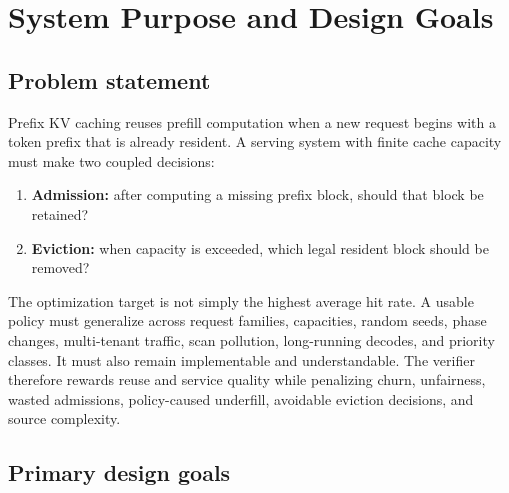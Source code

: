 \documentclass[11pt]{article}
\begin{document}
\begin{abstract}
The report emphasizes implementation details and trust boundaries: what the policy can
observe, what the simulator owns, what future information is quarantined for verifier
audits and oracle baselines, how each trial is scored, and how candidate source is
generated, isolated, evaluated, ranked, and persisted.  It also consolidates the
evidence-backed policy, verifier, and search principles discovered across the evolution
history, while keeping unresolved hypotheses explicitly separate.
\end{abstract}

\tableofcontents
\newpage

\section{System Purpose and Design Goals}

\subsection{Problem statement}

Prefix KV caching reuses prefill computation when a new request begins with a token
prefix that is already resident.  A serving system with finite cache capacity must make
two coupled decisions:

\begin{enumerate}
  \item \textbf{Admission:} after computing a missing prefix block, should that block be
  retained?
  \item \textbf{Eviction:} when capacity is exceeded, which legal resident block should
  be removed?
\end{enumerate}

The optimization target is not simply the highest average hit rate.  A usable policy
must generalize across request families, capacities, random seeds, phase changes,
multi-tenant traffic, scan pollution, long-running decodes, and priority classes.  It
must also remain implementable and understandable.  The verifier therefore rewards
reuse and service quality while penalizing churn, unfairness, wasted admissions,
policy-caused underfill, avoidable eviction decisions, and source complexity.

\subsection{Primary design goals}
\end{document}
